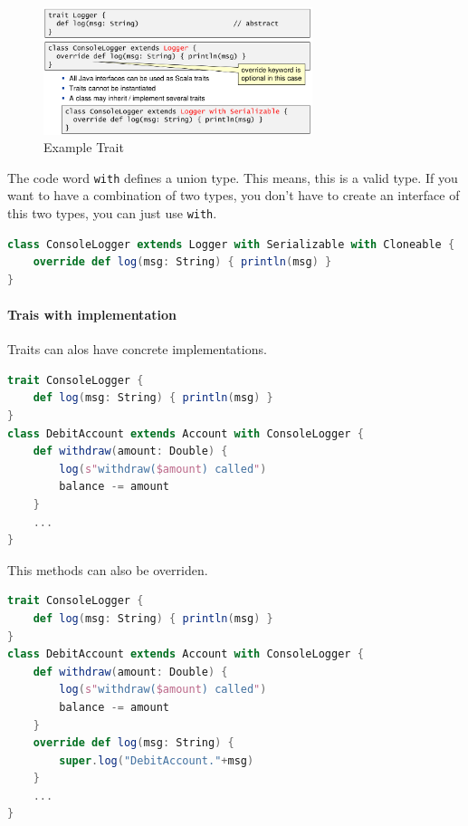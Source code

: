 \begin{figure}[H]
\centering
\includegraphics[width=0.7\textwidth]{figures/exampleTrait.png}
\caption{Example Trait}
\end{figure}

The code word \texttt{with} defines a union type. This means, this is a
valid type. If you want to have a combination of two types, you don't
have to create an interface of this two types, you can just use
\texttt{with}.

\begin{lstlisting}[language=scala,mathescape=false]
class ConsoleLogger extends Logger with Serializable with Cloneable {
    override def log(msg: String) { println(msg) }
}
\end{lstlisting}

\hypertarget{trais-with-implementation}{%
\paragraph{Trais with implementation}\label{trais-with-implementation}}

Traits can alos have concrete implementations.

\begin{lstlisting}[language=scala,mathescape=false]
trait ConsoleLogger {
    def log(msg: String) { println(msg) }
}
class DebitAccount extends Account with ConsoleLogger {
    def withdraw(amount: Double) {
        log(s"withdraw($amount) called")
        balance -= amount
    }
    ...
}
\end{lstlisting}

This methods can also be overriden.

\begin{lstlisting}[language=scala,mathescape=false]
trait ConsoleLogger {
    def log(msg: String) { println(msg) }
}
class DebitAccount extends Account with ConsoleLogger {
    def withdraw(amount: Double) {
        log(s"withdraw($amount) called")
        balance -= amount
    }
    override def log(msg: String) {
        super.log("DebitAccount."+msg)
    }
    ...
}
\end{lstlisting}

